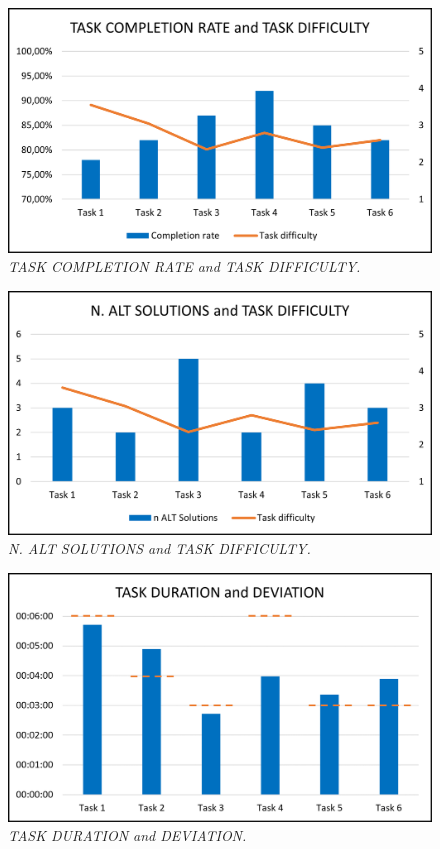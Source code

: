 \begin{figure}[h]
	\includegraphics[width=\textwidth]{UT_Visual_illustration_1.png}
	\caption{\textit{TASK COMPLETION RATE and TASK DIFFICULTY.}}
	\label{fig:label1}
\end{figure}
\begin{figure}[h]
	\includegraphics[width=\textwidth]{UT_Visual_illustration_2.png}
	\caption{\textit{N. ALT SOLUTIONS and TASK DIFFICULTY.}}
	\label{fig:label2}
\end{figure}
\begin{figure}[h]
	\includegraphics[width=\textwidth]{UT_Visual_illustration_3.png}
	\caption{\textit{TASK DURATION and DEVIATION.}}
	\label{fig:label3}
\end{figure}
